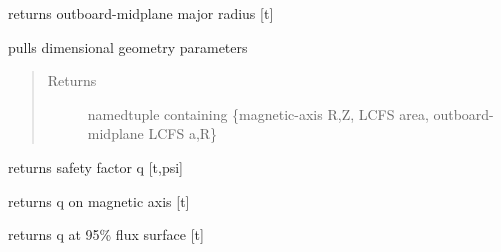 \documentclass[letterpaper,10pt,english]{sphinxmanual}
\begin{document}
\begin{fulllineitems}
\begin{fulllineitems}
\end{fulllineitems}


\begin{fulllineitems}
\label{eqtools:eqtools.EFIT.EFITTree.getRmidOut}
returns outboard-midplane major radius {[}t{]}

\end{fulllineitems}


\begin{fulllineitems}
\label{eqtools:eqtools.EFIT.EFITTree.getGeometry}
pulls dimensional geometry parameters
\begin{quote}\begin{description}
\item[{Returns}] \leavevmode
namedtuple containing \{magnetic-axis R,Z, LCFS area, outboard-midplane LCFS a,R\}

\end{description}\end{quote}

\end{fulllineitems}


\begin{fulllineitems}
\label{eqtools:eqtools.EFIT.EFITTree.getQProfile}
returns safety factor q {[}t,psi{]}

\end{fulllineitems}


\begin{fulllineitems}
\label{eqtools:eqtools.EFIT.EFITTree.getQ0}
returns q on magnetic axis {[}t{]}

\end{fulllineitems}


\begin{fulllineitems}
\label{eqtools:eqtools.EFIT.EFITTree.getQ95}
returns q at 95\% flux surface {[}t{]}


\end{fulllineitems}
\end{fulllineitems}
\end{document}
